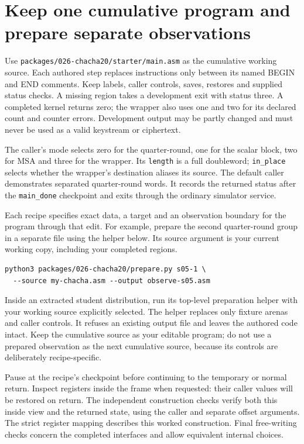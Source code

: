 \section{Keep one cumulative program and prepare separate observations}
Use \texttt{packages/026-chacha20/starter/main.asm} as the cumulative working source. Each authored step replaces instructions only between its named
BEGIN and END comments. Keep labels, caller controls, saves, restores and supplied
status checks. A missing region takes a development exit with status three. A
completed kernel returns zero; the wrapper also uses one and two for its declared
count and counter errors. Development output may be partly changed and must never
be used as a valid keystream or ciphertext.

The caller's mode selects zero for the quarter-round, one for the scalar block,
two for MSA and three for the wrapper. Its \texttt{length} is a full doubleword;
\texttt{in\_place} selects whether the wrapper's destination aliases its source.
The default caller demonstrates separated quarter-round words. It records the
returned status after the \texttt{main\_done} checkpoint and exits through the
ordinary simulator service.

Each recipe specifies exact data, a target and an observation boundary for the
program through that edit. For example, prepare the second quarter-round group
in a separate file using the helper below. Its source argument is your current
working copy, including your completed regions.
\begin{verbatim}
python3 packages/026-chacha20/prepare.py s05-1 \
  --source my-chacha.asm --output observe-s05.asm
\end{verbatim}
Inside an extracted student distribution, run its top-level preparation helper
with your working source explicitly selected. The helper replaces only fixture
arenas and caller controls. It refuses an
existing output file and leaves the authored code intact. Keep the cumulative
source as your editable program; do not use a prepared observation as the next
cumulative source, because its controls are deliberately recipe-specific.

Pause at the recipe's checkpoint before continuing to the temporary or normal
return. Inspect registers inside the frame when requested: their caller values
will be restored on return. The independent construction checks verify both this
inside view and the returned state, using the caller and separate offset arguments.
The strict register mapping describes this worked construction. Final free-writing
checks concern the completed interfaces and allow equivalent internal choices.
